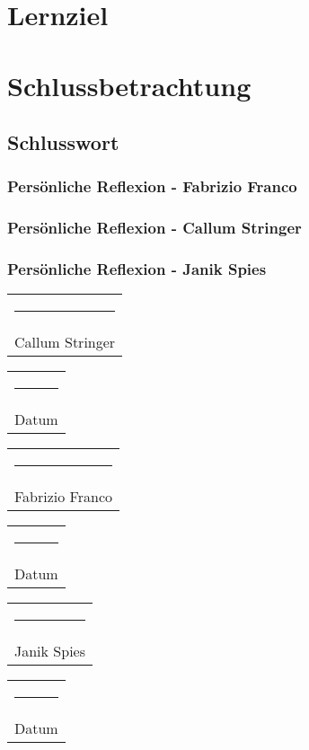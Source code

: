 \documentclass[12pt]{scrartcl}
\begin{document}
\section{Lernziel}

\section{Schlussbetrachtung}

\subsection{Schlusswort}
\subsubsection{Persönliche Reflexion - Fabrizio Franco}
\subsubsection{Persönliche Reflexion - Callum Stringer}
\subsubsection{Persönliche Reflexion - Janik Spies}

\nocite{*}
\printbibliography[title={Quellenverzeichnis}]


\renewcommand{\listfigurename}{Abbildungsverzeichnis}
\renewcommand{\listtablename}{Tabellenverzeichnis}


\vspace*{4em}\noindent
\hfill%
\begin{tabular}[t]{c}
	\rule{10em}{0.4pt} \\ Callum Stringer
\end{tabular}%
\hfill%
\begin{tabular}[t]{c}
	\rule{10em}{0.4pt} \\ Datum
\end{tabular}%
\hfill\strut

\vspace*{4em}\noindent
\hfill%
\begin{tabular}[t]{c}
	\rule{10em}{0.4pt} \\ Fabrizio Franco
\end{tabular}%
\hfill%
\begin{tabular}[t]{c}
	\rule{10em}{0.4pt} \\ Datum
\end{tabular}%
\hfill\strut

\vspace*{4em}\noindent
\hfill%
\begin{tabular}[t]{c}
	\rule{10em}{0.4pt} \\ Janik Spies
\end{tabular}%
\hfill%
\begin{tabular}[t]{c}
	\rule{10em}{0.4pt} \\ Datum
\end{tabular}%
\hfill\strut
\end{document}
